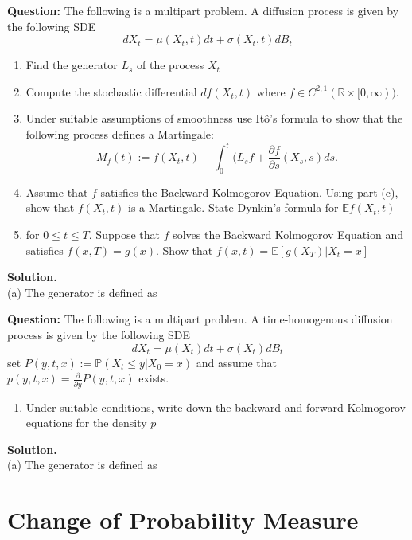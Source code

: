 \documentclass{article}
\begin{document}
\begin{tcolorbox}[colframe=black,colback=gray!5,boxrule=0.5pt]
\textbf{Question:} The following is a multipart problem. A diffusion process is given by the following SDE 
$$dX_t = \mu(X_t,t)dt + \sigma(X_t,t)dB_t$$
\begin{enumerate}[label=(\alph*)]
    \item Find the generator $L_s$ of the process $X_t$
    \item Compute the stochastic differential $df(X_t,t)$ where $f\in C^{2,1}(\mathbb{R}\times[0,\infty))$. 
    \item Under suitable assumptions of smoothness use Itô's formula to show that the following process defines a Martingale:
    $$M_f(t):=f(X_t,t)-\int_0^t(L_sf+\frac{\partial f}{\partial s}(X_s,s)ds.$$
    \item Assume that $f$ satisfies the Backward Kolmogorov Equation. Using part (c), show that $f(X_t,t)$ is a Martingale. State Dynkin's formula for $\mathbb{E}f(X_t,t)$
    \item for $0\leq t\leq T$. Suppose that $f$ solves the Backward Kolmogorov Equation and satisfies $f(x,T)=g(x)$. Show that $f(x,t) = \mathbb{E}[g(X_T)|X_t=x]$
\end{enumerate}
\end{tcolorbox}
\textbf{Solution.} \\
(a) The generator is defined as


\begin{tcolorbox}[colframe=black,colback=gray!5,boxrule=0.5pt]
\textbf{Question:} The following is a multipart problem. A time-homogenous diffusion process is given by the following SDE 
$$dX_t = \mu(X_t)dt + \sigma(X_t)dB_t$$
set $P(y,t,x) := \mathbb{P}(X_t\leq y|X_0=x)$ and assume that $p(y,t,x)=\frac{\partial}{\partial y}P(y,t,x)$ exists.
\begin{enumerate}[label=(\alph*)]
    \item Under suitable conditions, write down the backward and forward Kolmogorov equations for the density $p$
\end{enumerate}
\end{tcolorbox}
\textbf{Solution.} \\
(a) The generator is defined as



\newpage
\section{Change of Probability Measure}
\end{document}
